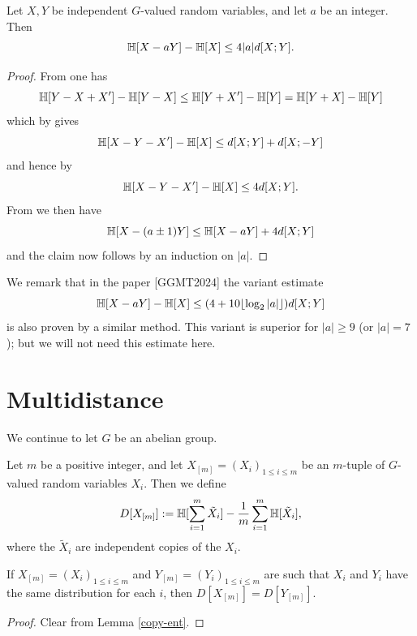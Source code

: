 \begin{lemma}\label{sum-dilate-II}\leanok  Let $X,Y$ be independent $G$-valued random variables, and let $a$ be an integer.  Then
  $$\mathbb{H}[X-aY] - \mathbb{H}[X] \leq 4 |a| d[X;Y].$$
\end{lemma}

\begin{proof}\leanok From  one has
  $$\mathbb{H}[Y-X+X'] - \mathbb{H}[Y-X] \leq \mathbb{H}[Y+X'] - \mathbb{H}[Y] = \mathbb{H}[Y+X] - \mathbb{H}[Y]$$
  which by  gives
  $$\mathbb{H}[X-Y-X'] -\mathbb{H}[X] \leq d[X;Y] + d[X;-Y]$$
  and hence by 
  $$\mathbb{H}[X-Y-X'] - \mathbb{H}[X] \leq 4d[X;Y].$$
  From  we then have
  $$\mathbb{H}[X-(a\pm 1)Y] \leq \mathbb{H}[X-aY] + 4 d[X;Y]$$
and the claim now follows by an induction on $|a|$.
\end{proof}

We remark that in the paper [GGMT2024] the variant estimate
$$\mathbb{H}[X-aY] - \mathbb{H}[X] \leq (4 + 10 \lfloor \log_2 |a| \rfloor) d[X;Y]$$
is also proven by a similar method.  This variant is superior for $|a| \geq 9$ (or $|a|=7$); but we will not need this estimate here.



\section{Multidistance}

We continue to let $G$ be an abelian group.

\begin{definition}[Multidistance]\label{multidist-def}\leanok  Let $m$ be a positive integer, and let $X_{[m]} = (X_i)_{1 \leq i \leq m}$ be an $m$-tuple of $G$-valued random variables $X_i$. Then we define
\[
  D[X_{[m]}] := \mathbb{H}[\sum_{i=1}^m \tilde X_i] - \frac{1}{m} \sum_{i=1}^m \mathbb{H}[\tilde X_i],
\]
where the $\tilde X_i$ are independent copies of the $X_i$.
\end{definition}

\begin{lemma}\label{multidist-copy}\leanok  If $X_{[m]} = (X_i)_{1 \leq i \leq m}$ and $Y_{[m]} = (Y_i)_{1 \leq i \leq m}$ are such that $X_i$ and $Y_i$ have the same distribution for each $i$, then $D[X_{[m]}] = D[Y_{[m]}]$.
\end{lemma}

\begin{proof}\leanok Clear from Lemma \ref{copy-ent}.
\end{proof}

